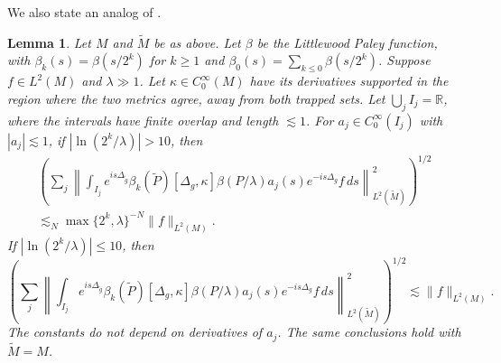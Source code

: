 \documentclass[11pt]{amsart}
\newcommand{\la}{\lambda}
\newtheorem{lemma}{Lemma}[section]
\begin{document}
We also state an analog of \cite[Lemma 2.5]{HSTZ}.
\begin{lemma}\label{global1}
Let $M$ and $\tilde M$ be as above. Let $\beta$ be the Littlewood Paley function, with $\beta_k(s)=\beta(s/2^k)$ for $k\geq1$ and $\beta_0(s)=\sum_{k\leq0}\beta(s/2^k)$. Suppose $f\in L^2(M)$ and $\la\gg1$. Let $\kappa\in C_0^\infty(M)$ have its derivatives supported in the region where the two metrics agree, away from both trapped sets. Let $\bigcup_j I_j=\mathbb R$, where the intervals have finite overlap and length $\lesssim1$. For $a_j\in C_0^\infty(I_j)$ with $|a_j|\lesssim1$, if $|\ln(2^k/\la)|>10$, then
\begin{multline}\label{eq:guess-2}
\left(\sum_j\left\|\int_{I_j}e^{is\Delta_{\tilde g}}\beta_k(\tilde P)
[\Delta_g,\kappa]\beta(P/\la)a_j(s)e^{-is\Delta_g}f\,ds\right\|_{L^2(\tilde M)}^2\right)^{1/2}\\
\lesssim_N\max\{2^k,\la\}^{-N}\|f\|_{L^2(M)}.
\end{multline}
If $|\ln(2^k/\la)|\leq10$, then
\begin{equation}\label{eq:guess-22}
\left(\sum_j\left\|\int_{I_j}e^{is\Delta_{\tilde g}}\beta_k(\tilde P)
[\Delta_g,\kappa]\beta(P/\la)a_j(s)e^{-is\Delta_g}f\,ds\right\|_{L^2(\tilde M)}^2\right)^{1/2}
\lesssim\|f\|_{L^2(M)}.
\end{equation}
The constants do not depend on derivatives of $a_j$. The same conclusions hold with $\tilde M=M$.
\end{lemma}
\end{document}

